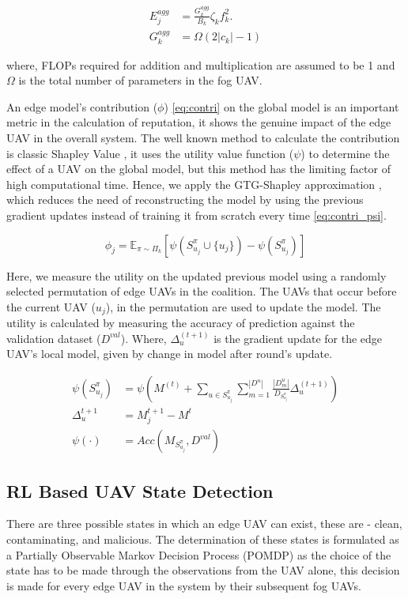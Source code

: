 \documentclass[10pt,journal,compsoc]{IEEEtran}
\begin{document}
\begin{align}\label{eq:energy_agg}
E_j^{agg}
&=
\frac{G_k^{agg}}{B_k}
\zeta_k f_k^2 .
\\
G_k^{agg}
&= 
\Omega (2|c_k|-1)
\end{align}

where, FLOPs required for addition and multiplication are assumed to be 1 and $\Omega$ is the total number of parameters in the fog UAV.

An edge model's contribution ($\phi$) \eqref{eq:contri} on the global model is an important metric in the calculation of reputation, it shows the genuine impact of the edge UAV in the overall system. 
The well known method to calculate the contribution is classic Shapley Value \cite{shapley}, it uses the utility value function ($\psi$) to determine the effect of a UAV on the global model, but this method has the limiting factor of high computational time. Hence, we apply the GTG-Shapley approximation \cite{gtg_shapley}, which reduces the need of reconstructing the model by using the previous gradient updates instead of training it from scratch every time \eqref{eq:contri_psi}.

\begin{equation}\label{eq:contri}
\phi_j
= 
\mathbb{E}_{\pi \sim \Pi_k}
[
\psi(S_{u_j}^{\pi} \cup  \{u_j\}) 
-
\psi(S_{u_j}^{\pi})
]
\end{equation}

Here, we measure the utility on the updated previous model using a randomly selected permutation of edge UAVs in the coalition. The UAVs that occur before the current UAV ($u_j$), in the permutation are used to update the model. The utility is calculated by measuring the accuracy of prediction against the validation dataset ($D^{val}$). 
Where, $\Delta_u^{(t+1)}$  is the gradient update for the edge UAV's local model, given by change in model after round's update.

\begin{align}\label{eq:contri_psi}
\psi(S_{u_j}^{\pi})
&=
\psi \left(
M^{(t)} + \sum_{u \in S_{u_j}^{\pi}}
\sum_{m = 1} ^{|D^u|}
\frac {|D_m^u|} {D_{S_{u_j}^{\pi}}}
\Delta_u^{(t+1)}
\right)
\\
\Delta_u^{t+1} &= M_j^{t+1} - M^t
\\
\psi(\cdot) 
&=
Acc(M_{S_{u_j}^{\pi}}, D^{val})
\end{align}


\subsection{RL Based UAV State Detection}
There are three possible states in which an edge UAV can exist, these are - clean, contaminating, and malicious. The determination of these states is formulated as a Partially Observable Markov Decision Process (POMDP) as the choice of the state has to be made through the observations from the UAV alone, this decision is made for every edge UAV in the system by their subsequent fog UAVs.
\end{document}
